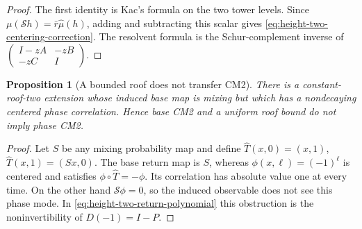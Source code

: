 \documentclass[11pt]{article}
\newtheorem{proposition}[theorem]{Proposition}
\begin{document}
\begin{proof}
The first identity is Kac's formula on the two tower levels.  Since
$\mu(\mathcal S h)=\bar r\widehat\mu(h)$, adding and subtracting this scalar
gives \eqref{eq:height-two-centering-correction}.  The resolvent formula is
the Schur-complement inverse of
$\left(\begin{smallmatrix}I-zA&-zB\\-zC&I\end{smallmatrix}\right)$.
\end{proof}

\begin{proposition}[A bounded roof does not transfer CM2]
\label{prop:bounded-roof-not-CM2}
There is a constant-roof-two extension whose induced base map is mixing but
which has a nondecaying centered phase correlation.  Hence base CM2 and a
uniform roof bound do not imply phase CM2.
\end{proposition}

\begin{proof}
Let $S$ be any mixing probability map and define
$\widehat T(x,0)=(x,1)$, $\widehat T(x,1)=(Sx,0)$.  The base return map is
$S$, whereas $\phi(x,\ell)=(-1)^\ell$ is centered and satisfies
$\phi\circ\widehat T=-\phi$.  Its correlation has absolute value one at
every time.  On the other hand
$\mathcal S\phi=0$, so the induced observable does not see this phase mode.
In \eqref{eq:height-two-return-polynomial} this obstruction is the
noninvertibility of $D(-1)=I-P$.
\end{proof}
\end{document}
